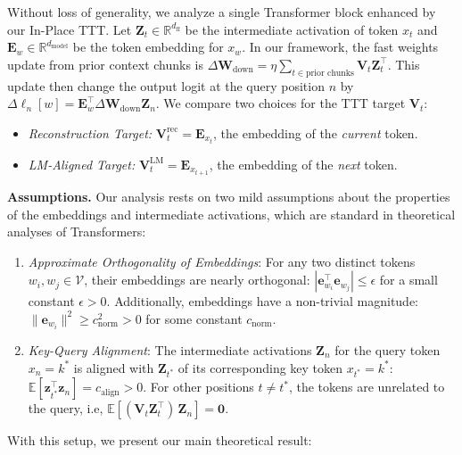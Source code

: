 Without loss of generality, we analyze a single Transformer block enhanced by our In-Place TTT. Let $\mathbf{Z}_t \in \mathbb{R}^{d_{\mathrm{ff}}}$ be the intermediate activation of token $x_t$ and $\mathbf{E}_w \in \mathbb{R}^{d_{\mathrm{model}}}$ be the token embedding for $x_w$. In our framework, the fast weights update from prior context chunks is $\Delta \mathbf{W}_{\mathrm{down}} = \eta \sum_{t \in \text{prior chunks}} {\mathbf{V}}_{t} \mathbf{Z}_{t}^\top$. This update then change the output logit at the query position $n$ by $\Delta \boldsymbol{\ell}_{n}[w] = \mathbf{E}_w^\top \Delta \mathbf{W}_{\mathrm{down}}\mathbf{Z}_{n}$. We compare two choices for the TTT target $\mathbf{V}_t$:

\begin{itemize}
    \item \textit{Reconstruction Target:} $\mathbf{V}_t^{\mathrm{rec}} = \mathbf{E}_{x_t}$, the embedding of the \textit{current} token.
    \item \textit{LM-Aligned Target:} $\mathbf{V}_t^{\mathrm{LM}} = \mathbf{E}_{x_{t+1}}$, the embedding of the \textit{next} token.
\end{itemize}

\textbf{Assumptions.}
Our analysis rests on two mild assumptions about the properties of the embeddings and intermediate activations, which are standard in theoretical analyses of Transformers:

\begin{enumerate}
    \item \textit{Approximate Orthogonality of Embeddings}: For any two distinct tokens $w_i, w_j \in \mathcal{V}$, their embeddings are nearly orthogonal: $|\mathbf{e}_{w_i}^\top \mathbf{e}_{w_j}| \leq \epsilon$ for a small constant $\epsilon > 0$. Additionally, embeddings have a non-trivial magnitude: $\|\mathbf{e}_{w_i}\|^2 \geq c_{\text{norm}}^2 > 0$ for some constant $c_{\text{norm}}$.
    \item \textit{Key-Query Alignment}: The intermediate activations $\mathbf{Z}_n$ for the query token $x_n=k^*$ is aligned with $\mathbf{Z}_{t^*}$ of its corresponding key token $x_{t^*}=k^*$: $\mathbb{E}[\mathbf{z}_{t^*}^\top \mathbf{z}_{n}] = c_{\text{align}} > 0$. For other positions $t \neq t^*$, the tokens are unrelated to the query, i.e, $\mathbb{E}\!\left[(\mathbf{V}_t \mathbf{Z}_t^\top)\,\mathbf{Z}_n\right] = \mathbf{0}.$
\end{enumerate}

With this setup, we present our main theoretical result:

